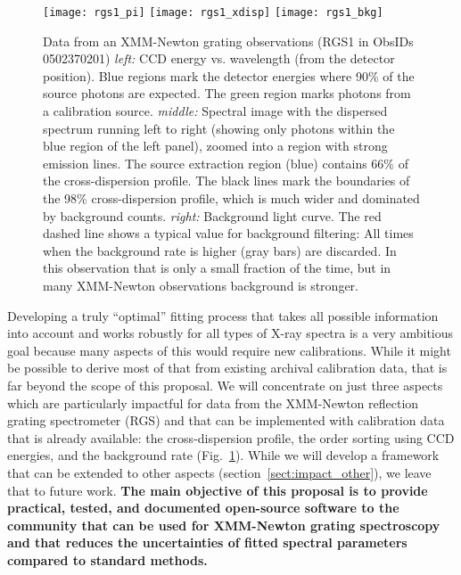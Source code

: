 \documentclass[fleqn,12pt,onecolumn]{SelfArx} %
\begin{document}
\begin{figure}
    \texttt{[image: rgs1\_pi]}
    \texttt{[image: rgs1\_xdisp]}
    \texttt{[image: rgs1\_bkg]}
    \caption{Data from an XMM-Newton grating observations (RGS1 in ObsIDs 0502370201)
    \emph{left:} CCD energy vs. wavelength (from the detector position). Blue regions mark the detector energies where 90\% of the source photons are expected. The green region marks photons from a calibration source.
    \emph{middle:} Spectral image with the dispersed spectrum running left to right (showing only photons within the blue region of the left panel), zoomed into a region with strong emission lines. The source extraction region (blue) contains 66\% of the cross-dispersion profile. The black lines mark the boundaries of the 98\% cross-dispersion profile, which is much wider and dominated by background counts.
    \emph{right:} Background light curve. The red dashed line shows a typical value for background filtering: All times when the background rate is higher (gray bars) are discarded. In this observation that is only a small fraction of the time, but in many XMM-Newton observations background is stronger.
    \label{fig:rgs1}}
\end{figure}

Developing a truly ``optimal'' fitting process that takes all possible information into account and works robustly for all types of X-ray spectra is a very ambitious goal because many aspects of this would require new calibrations. While it might be possible to derive most of that from existing archival calibration data, that is far beyond the scope of this proposal. We will concentrate on just three aspects which are particularly impactful for data from the XMM-Newton reflection grating spectrometer (RGS) and that can be implemented with calibration data that is already available: the cross-dispersion profile, the order sorting using CCD energies, and the background rate (Fig.~\ref{fig:rgs1}). While we will develop a framework that can be extended to other aspects (section~\ref{sect:impact_other}), we leave that to future work. \textbf{The main objective of this proposal is to provide practical, tested, and documented open-source software to the community that can be used for XMM-Newton grating spectroscopy and that reduces the uncertainties of fitted spectral parameters compared to standard methods.}

\end{document}
